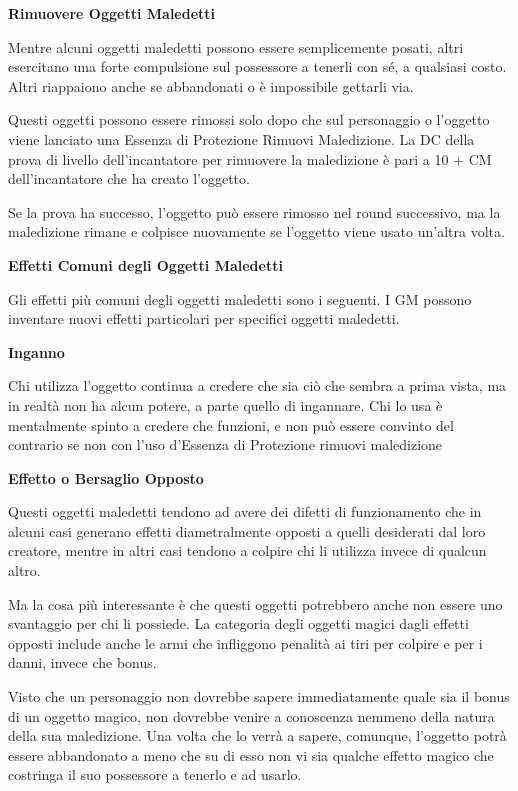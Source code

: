 \documentclass[a4paper,11pt,twoside,openany]{book}
\begin{document}
{\textbf{Rimuovere Oggetti Maledetti}

Mentre alcuni oggetti maledetti possono essere semplicemente posati, altri esercitano una forte compulsione sul possessore a tenerli con sé, a qualsiasi costo. Altri riappaiono anche se abbandonati o è impossibile gettarli via.

Questi oggetti possono essere rimossi solo dopo che sul personaggio o l'oggetto viene lanciato una Essenza di Protezione Rimuovi Maledizione. La DC della prova di livello dell'incantatore per rimuovere la maledizione è pari a 10 + CM dell'incantatore che ha creato l'oggetto.

Se la prova ha successo, l'oggetto può essere rimosso nel round successivo, ma la maledizione rimane e colpisce nuovamente se l'oggetto viene usato un'altra volta.

\textbf{Effetti Comuni degli Oggetti Maledetti}

Gli effetti più comuni degli oggetti maledetti sono i seguenti. I GM possono inventare nuovi effetti particolari per specifici oggetti maledetti.

\textbf{Inganno}

Chi utilizza l'oggetto continua a credere che sia ciò che sembra a prima vista, ma in realtà non ha alcun potere, a parte quello di ingannare. Chi lo usa è mentalmente spinto a credere che funzioni, e non può essere convinto del contrario se non con l'uso d'Essenza di Protezione rimuovi maledizione

\textbf{Effetto o Bersaglio Opposto}

Questi oggetti maledetti tendono ad avere dei difetti di funzionamento che in alcuni casi generano effetti diametralmente opposti a quelli desiderati dal loro creatore, mentre in altri casi tendono a colpire chi li utilizza invece di qualcun altro.

Ma la cosa più interessante è che questi oggetti potrebbero anche non essere uno svantaggio per chi li possiede. La categoria degli oggetti magici dagli effetti opposti include anche le armi che infliggono penalità ai tiri per colpire e per i danni, invece che bonus.

Visto che un personaggio non dovrebbe sapere immediatamente quale sia il bonus di un oggetto magico, non dovrebbe venire a conoscenza nemmeno della natura della sua maledizione. Una volta che lo verrà a sapere, comunque, l'oggetto potrà essere abbandonato a meno che su di esso non vi sia qualche effetto magico che costringa il suo possessore a tenerlo e ad usarlo.

}
\end{document}
